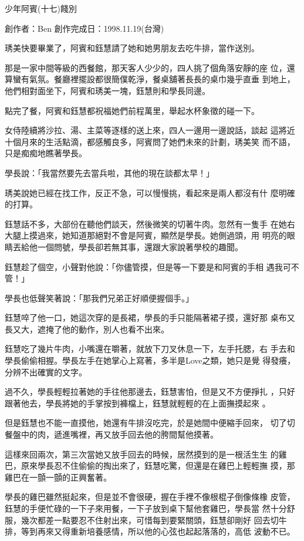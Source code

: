



少年阿賓(十七)餞別

創作者：Ben
創作完成日：1998.11.19(台灣)


琇美快要畢業了，阿賓和鈺慧請了她和她男朋友去吃牛排，當作送別。

那是一家中間等級的西餐館，那天客人少少的，四人挑了個角落安靜的座
位，還算蠻有氣氛。餐廳裡擺設都很簡僕乾淨，餐桌舖著長長的桌巾幾乎直垂
到地上，他們相對面坐下，阿賓和琇美一塊，鈺慧則和學長同邊。

點完了餐，阿賓和鈺慧都祝福她們前程萬里，舉起水杯象徵的碰一下。

女侍陸續將沙拉、湯、主菜等逐樣的送上來，四人一邊用一邊說話，談起
這將近十個月來的生活點滴，都感觸良多，阿賓問了她們未來的計劃，琇美笑
而不語，只是痴痴地瞧著學長。

學長說：「我當然要先去當兵啦，其他的現在談都太早！」

琇美說她已經在找工作，反正不急，可以慢慢挑，看起來是兩人都沒有什
麼明確的打算。

鈺慧話不多，大部份在聽他們談天，然後微笑的切著牛肉。忽然有一隻手
在她右大腿上摸過來，她知道那絕對不會是阿賓，顯然是學長。她側過頭，用
明亮的眼睛丟給他一個問號，學長卻若無其事，還跟大家說著學校的趣聞。

鈺慧趁了個空，小聲對他說：「你儘管摸，但是等一下要是和阿賓的手相
遇我可不管！」

學長也低聲笑著說：「那我們兄弟正好順便握個手。」

鈺慧啐了他一口，她這次穿的是長裙，學長的手只能隔著裙子摸，還好那
桌布又長又大，遮掩了他的動作，別人也看不出來。

鈺慧吃了幾片牛肉，小嘴還在嚼著，就放下刀叉休息一下，左手托腮，右
手去和學長偷偷相握。學長左手在她掌心上寫著，多半是Love之類，她只是覺
得發癢，分辨不出確實的文字。

過不久，學長輕輕拉著她的手往他那邊去，鈺慧害怕，但是又不方便掙扎
，只好跟著他去，學長將她的手掌按到褲檔上，鈺慧就輕輕的在上面撫摸起來
。

但是鈺慧也不能一直摸他，她還有牛排沒吃完，於是她間中便縮手回來，
切了切餐盤中的肉，遞進嘴裡，再又放手回去他的胯間幫他摸著。

這樣來回兩次，第三次當她又放手回去的時候，居然摸到的是一根活生生
的雞巴，原來學長忍不住偷偷的掏出來了，鈺慧吃驚，但還是在雞巴上輕輕撫
摸，那雞巴在一顫一顫的正興奮著。

學長的雞巴雖然挺起來，但是並不會很硬，握在手裡不像根棍子倒像條橡
皮管，鈺慧的手便忙碌的一下子來用餐，一下子放到桌下幫他套雞巴，學長當
然十分舒服，幾次都差一點要忍不住射出來，可惜每到要緊關頭，鈺慧卻剛好
回去切牛排，等到再來又得重新培養感情，所以他的心弦也起起落落的，高低
波動不已。

